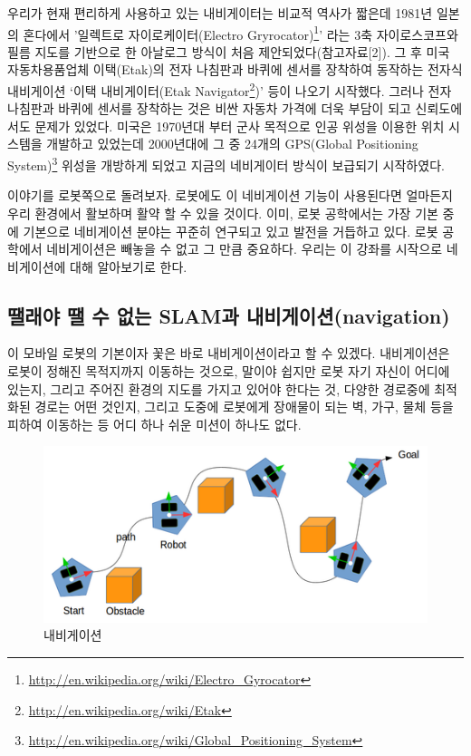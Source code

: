 우리가 현재 편리하게 사용하고 있는 내비게이터는 비교적 역사가 짧은데 1981년 일본의 혼다에서 '일렉트로 자이로케이터(Electro Gryrocator)\footnote{\url{http://en.wikipedia.org/wiki/Electro_Gyrocator}}’ 라는 3축 자이로스코프와 필름 지도를 기반으로 한 아날로그 방식이 처음 제안되었다(참고자료[2]). 그 후 미국 자동차용품업체 이택(Etak)의 전자 나침판과 바퀴에 센서를 장착하여 동작하는 전자식 내비게이션 ‘이택 내비게이터(Etak Navigator\footnote{\url{http://en.wikipedia.org/wiki/Etak}})’ 등이 나오기 시작했다. 그러나 전자 나침판과 바퀴에 센서를 장착하는 것은 비싼 자동차 가격에 더욱 부담이 되고 신뢰도에서도 문제가 있었다. 미국은 1970년대 부터 군사 목적으로 인공 위성을 이용한 위치 시스템을 개발하고 있었는데 2000년대에 그 중 24개의 GPS(Global Positioning System)\footnote{\url{http://en.wikipedia.org/wiki/Global_Positioning_System}} 위성을 개방하게 되었고 지금의 네비게이터 방식이 보급되기 시작하였다.

이야기를 로봇쪽으로 돌려보자. 로봇에도 이 네비게이션 기능이 사용된다면 얼마든지 우리 환경에서 활보하며 활약 할 수 있을 것이다. 이미, 로봇 공학에서는 가장 기본 중에 기본으로 네비게이션 분야는 꾸준히 연구되고 있고 발전을 거듭하고 있다. 로봇 공학에서 네비게이션은 빼놓을 수 없고 그 만큼 중요하다. 우리는 이 강좌를 시작으로 네비게이션에 대해 알아보기로 한다.

\subsection{땔래야 땔 수 없는 SLAM과 내비게이션(navigation)}

이 모바일 로봇의 기본이자 꽃은 바로 내비게이션이라고 할 수 있겠다. 내비게이션은 로봇이 정해진 목적지까지 이동하는 것으로, 말이야 쉽지만 로봇 자기 자신이 어디에 있는지, 그리고 주어진 환경의 지도를 가지고 있어야 한다는 것, 다양한 경로중에 최적화된 경로는 어떤 것인지, 그리고 도중에 로봇에게 장애물이 되는 벽, 가구, 물체 등을 피하여 이동하는 등 어디 하나 쉬운 미션이 하나도 없다. 

\begin{figure}[h]
\centering\includegraphics[width=0.8\columnwidth]{pictures/chapter11/navigation_concept.png}
\caption{내비게이션}
\end{figure}

